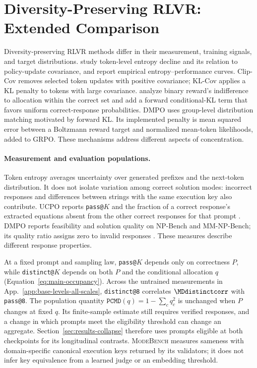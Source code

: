 \documentclass{article}
\makeatletter
\newcommand{\1}{\mathbf 1}
\newcommand{\mb}{\textsc{ModeBench}}
\newcommand{\pmd}{\texttt{PCMD}}
\newcommand{\distk}{\texttt{distinct@8}}
\theoremstyle{remark}
\theoremstyle{definition}
\theoremstyle{plain}
\makeatother
\begin{document}
\section{Diversity-Preserving RLVR: Extended Comparison}
\label{app:related-extended}

Diversity-preserving RLVR methods differ in their measurement, training
signals, and target distributions. \citet{cui2025entropy} study token-level
entropy decline and its relation to policy-update covariance, and report
empirical entropy--performance curves. Clip-Cov removes selected token
updates with positive covariance; KL-Cov applies a KL penalty to tokens with
large covariance. \citet{lochab2026ucpo} analyze binary reward's indifference
to allocation within the correct set and add a forward conditional-KL term
that favors uniform correct-response probabilities. DMPO
\citep{li2026distribution} uses group-level distribution matching motivated
by forward KL. Its implemented penalty is mean squared error between a
Boltzmann reward target and normalized mean-token likelihoods, added to
GRPO. These mechanisms address different aspects of concentration.

\paragraph{Measurement and evaluation populations.}
Token entropy averages uncertainty over generated prefixes and the next-token
distribution. It does not isolate variation among correct solution modes:
incorrect responses and differences between strings with the same execution
key also contribute. UCPO reports \texttt{pass@}$K$ and the fraction of a
correct response's extracted equations absent from the other correct
responses for that prompt \citep[App.~F]{lochab2026ucpo}. DMPO reports
feasibility and solution quality on NP-Bench and MM-NP-Bench; its quality
ratio assigns zero to invalid responses \citep[Section~4.2]{li2026distribution}.
These measures describe different response properties.

At a fixed prompt and sampling law, \texttt{pass@}$K$ depends only on
correctness $P$, while \texttt{distinct@}$K$ depends on both $P$ and the
conditional allocation $q$ (Equation~\eqref{eq:main-occupancy}). Across the
\MDcells{} untrained measurements in App.~\ref{app:base-levels-all-scales},
\distk{} correlates $\MDdistinctcorr$ with \texttt{pass@8}.
The population quantity $\pmd(q)=1-\sum_cq_c^2$ is unchanged when $P$
changes at fixed $q$. Its finite-sample estimate still requires verified
responses, and a change in which prompts meet the eligibility threshold
can change an aggregate. Section~\ref{sec:results-collapse} therefore uses
prompts eligible at both checkpoints for its longitudinal contrasts.
\mb{} measures sameness with domain-specific canonical execution keys
returned by its validators; it does not infer key equivalence from a learned
judge or an embedding threshold.
\end{document}

